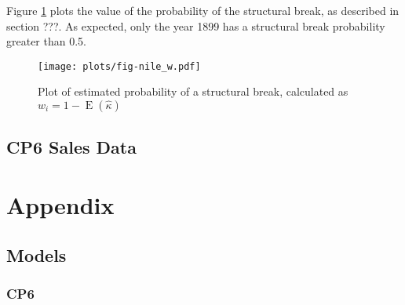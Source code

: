 \documentclass{article}
\DeclareMathOperator{\E}{E}
\begin{document}
Figure \ref{fig:nile_w} plots the value of the probability of the structural break, as described in section ???.
As expected, only the year 1899 has a structural break probability greater than 0.5.

\begin{figure}[htpb]
  \centering
  \texttt{[image: plots/fig-nile\_w.pdf]}
  \caption{Plot of estimated probability of a structural break, calculated as $w_{i} = 1 - \E(\hat{\kappa})$}
  \label{fig:nile_w}
\end{figure}

\subsection{CP6 Sales Data}
\label{sec:cp6-sales-data}


\section{Appendix}
\label{sec:appendix}


\subsection{Models}
\label{sec:models}

\subsubsection{CP6}
\label{sec:cp6}





\printbibliography{}
\end{document}
